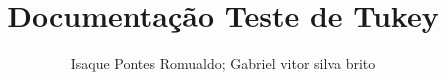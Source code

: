 \documentclass[versao=digital]{tc_ifgoiano_ceres}
\author{Isaque Pontes Romualdo; Gabriel vitor silva brito}
\title{Documentação Teste de Tukey}
\begin{document}
	
	
	\textual

	
	

\end{document}
